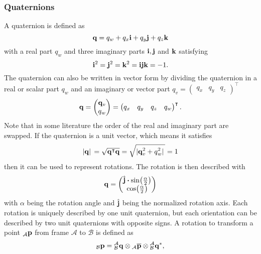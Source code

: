\subsubsection{Quaternions}
A quaternion is defined as
\begin{equation}
	\vb{q} = q_w + q_x\vb{i} + q_y\vb{j} + q_z\vb{k}
\end{equation}
with a real part $q_w$ and three imaginary parts $\vb{i}, \vb{j}$ and $\vb{k}$ satisfying
\begin{equation}
	\vb{i}^2 = \vb{j}^2 = \vb{k}^2 = \vb{i}\vb{j}\vb{k} = -1.
\end{equation}
The quaternion can also be written in vector form by dividing the quaternion in a real or scalar part $q_w$ and an imaginary or vector part $q_v = \begin{pmatrix} q_x & q_y & q_z	\end{pmatrix}^\intercal$
\begin{equation}
	\vb{q} = \begin{pmatrix}
		\vb{q}_v \\
		q_w
	\end{pmatrix}
	=\begin{pmatrix}
		q_x & q_y & q_z & q_w
	\end{pmatrix}^\intercal.
\end{equation}
Note that in some literature the order of the real and imaginary part are swapped.
If the quaternion is a unit vector, which means it satisfies
\begin{equation}
	\abs*{\vb{q}} = \sqrt{\vb{q}^\intercal \vb{q}} = \sqrt{\abs*{\vb{q}_v^2 + q_w^2}} = 1
\end{equation}
then it can be used to represent rotations.
The rotation is then described with
\begin{equation}
	\label{eq:quaternion}
	\vb{q} =
	\begin{pmatrix}
		\hat{\vb{j}}\vdot\sin(\frac{\alpha}{2}) \\
		\cos(\frac{\alpha}{2})
	\end{pmatrix}
\end{equation}
with $\alpha$ being the rotation angle and $\hat{\vb{j}}$ being the normalized rotation axis.
Each rotation is uniquely described by one unit quaternion, but each orientation can be described by two unit quaternions with opposite signs.
A rotation to transform a point ${}_\mathcal{A}\vb{p}$ from frame $\mathcal{A}$ to $\mathcal{B}$ is defined as
\begin{equation}
	{}_\mathcal{B}\vb{p} = \qtf{a}{b} \otimes {}_\mathcal{A}\overline{\vb{p}} \otimes \qtf{a}{b}^*,
\end{equation}

